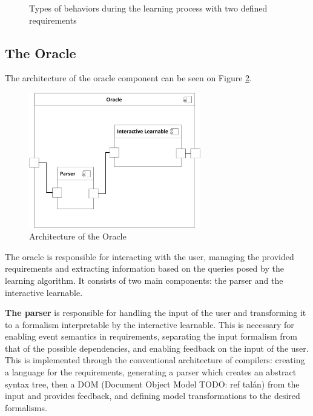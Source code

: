\begin{figure}[!ht] 
	\centering
	\caption{Types of behaviors during the learning process with two defined requirements} 
	\label{fig_architcture_commandhandling}
\end{figure} 



\subsection{The Oracle} \label{subs_oracle}

The architecture of the oracle component can be seen on Figure \ref{fig_architcture_oracle}.

\begin{figure}[!ht] 
	\centering
		\includegraphics[width=75mm, keepaspectratio]{figures/architecture_oracle.png}
	\caption{Architecture of the Oracle} 
	\label{fig_architcture_oracle}
\end{figure}

The oracle is responsible for interacting with the user, managing the provided requirements and extracting information based on the queries posed by the learning algorithm. It consists of two main components: the parser and the interactive learnable.

\textbf{The parser} is responsible for handling the input of the user and transforming it to a formalism interpretable by the interactive learnable. This is necessary for enabling event semantics in requirements, separating the input formalism from that of the possible dependencies, and enabling feedback on the input of the user. This is implemented through the conventional architecture of compilers: creating a language for the requirements, generating a parser which creates an abstract syntax tree, then a DOM (Document Object Model TODO: ref talán) from the input and provides feedback, and defining model transformations to the desired formalisms.

